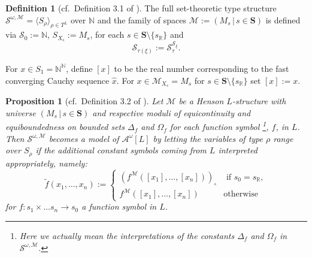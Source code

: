\documentclass[11pt]{amsart}
\newtheorem{proposition}[theorem]{Proposition}
\theoremstyle{definition}
\newtheorem{definition}[theorem]{Definition}
\theoremstyle{remark}
\def\NN{\mathbb{N}}
\def\RR{\mathbb{R}}
\begin{document}
\begin{definition}[cf.\ Definition 3.1 of \cite{kohlenbach2005some}]
    The full set-theoretic type structure $\mathcal{S}^{\omega,\mathscr{M}}= \langle S_\rho\rangle_{\rho \in T^L}$ over $\NN$ and the family of spaces $\mathscr{M}:=(M_s\,|\, s \in \mathbf{S})$ is defined via $\mathcal{S}_0:=\mathbb{N}$, $S_{X_s}:= M_s$, for each $ s \in \mathbf{S}\setminus \{s_\RR\}$  and
\[
\mathcal{S}_{\tau(\xi)}:=\mathcal{S}_{\tau}^{\mathcal{S}_{\xi}}.
\]
\end{definition}
 For $x \in S_1=\NN^\NN$, define $[x]$ to be the real number corresponding to the fast converging Cauchy sequence $\hat{x}$. For $x \in \mathcal{M}_{X_{s}}=M_s$ for $s \in \mathbf{S}\setminus \{s_\RR\}$ set $[x]:=x$. 
\begin{proposition}[cf.\ Definition 3.2 of \cite{kohlenbach2005some}]
\label{prop:model:set}
 Let $\mathscr{M}$ be a Henson $L$-structure with universe $(M_s\,|\, s \in \mathbf{S})$ and respective moduli of equicontinuity and equiboundedness on
bounded sets $\Delta_f$ and $\Omega_f$ for each function symbol \footnote{Here we actually mean the interpretations of the constants $\Delta_f$ and $\Omega_f$ in $\mathcal{S}^{\omega,\mathscr{M}}$.}, $f$, in $L$. Then $\mathcal{S}^{\omega,\mathscr{M}}$ becomes a model of $\mathcal{A}^\omega[L]$ by letting the variables of type $\rho$ range over $S_\rho$ if the additional constant symbols coming from $L$ interpreted appropriately, namely: 
\[
\tilde{f}(x_1,\ldots,x_n):=\begin{cases}(f^{\mathscr{M}}([x_1],\ldots,[x_n]))_\circ&\text{ if } s_0 =s_\RR,\\ f^{\mathscr{M}}([x_1],\ldots,[x_n]) &\text{otherwise}\end{cases}
\]
 for $f:s_1 \times \ldots s_n \to s_0 $ a function symbol in $L$. 
\end{proposition}
\end{document}
